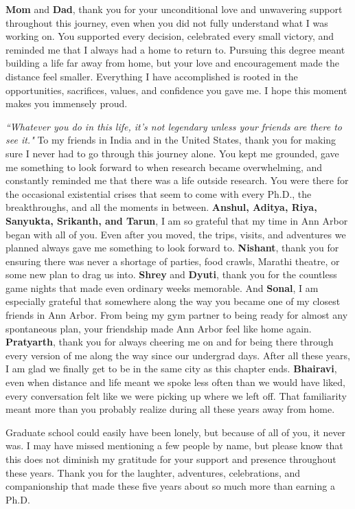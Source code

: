 \textbf{Mom} and \textbf{Dad}, thank you for your unconditional love and unwavering support throughout this journey, even when you did not fully understand what I was working on. You supported every decision, celebrated every small victory, and reminded me that I always had a home to return to. Pursuing this degree meant building a life far away from home, but your love and encouragement made the distance feel smaller. Everything I have accomplished is rooted in the opportunities, sacrifices, values, and confidence you gave me. I hope this moment makes you immensely proud.

\textit{``Whatever you do in this life, it's not legendary unless your friends are there to see it."} To my friends in India and in the United States, thank you for making sure I never had to go through this journey alone. You kept me grounded, gave me something to look forward to when research became overwhelming, and constantly reminded me that there was a life outside research. You were there for the occasional existential crises that seem to come with every Ph.D., the breakthroughs, and all the moments in between. \textbf{Anshul, Aditya, Riya, Sanyukta, Srikanth, and Tarun}, I am so grateful that my time in Ann Arbor began with all of you. Even after you moved, the trips, visits, and adventures we planned always gave me something to look forward to. \textbf{Nishant}, thank you for ensuring there was never a shortage of parties, food crawls, Marathi theatre, or some new plan to drag us into. \textbf{Shrey} and \textbf{Dyuti}, thank you for the countless game nights that made even ordinary weeks memorable. And \textbf{Sonal}, I am especially grateful that somewhere along the way you became one of my closest friends in Ann Arbor. From being my gym partner to being ready for almost any spontaneous plan, your friendship made Ann Arbor feel like home again. \textbf{Pratyarth}, thank you for always cheering me on and for being there through every version of me along the way since our undergrad days. After all these years, I am glad we finally get to be in the same city as this chapter ends. \textbf{Bhairavi}, even when distance and life meant we spoke less often than we would have liked, every conversation felt like we were picking up where we left off. That familiarity meant more than you probably realize during all these years away from home.

Graduate school could easily have been lonely, but because of all of you, it never was. I may have missed mentioning a few people by name, but please know that this does not diminish my gratitude for your support and presence throughout these years. Thank you for the laughter, adventures, celebrations, and companionship that made these five years about so much more than earning a Ph.D.

